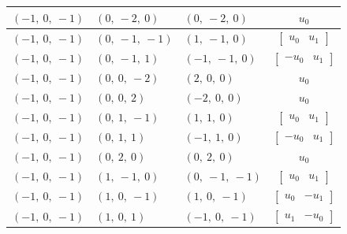 \documentclass[11pt]{article}
\theoremstyle{definition}
\begin{document}
\begin{longtable}{|l|l|l|c|}
    \hline
    $\left( -1, \  0, \  -1\right)$ & $\left( 0, \  -2, \  0\right)$ & $\left( 0, \  -2, \  0\right)$ & $u_{0}$ \\
    \hline
    $\left( -1, \  0, \  -1\right)$ & $\left( 0, \  -1, \  -1\right)$ & $\left( 1, \  -1, \  0\right)$ & $\left[\begin{matrix}u_{0} & u_{1}\end{matrix}\right]$ \\
    \hline
    $\left( -1, \  0, \  -1\right)$ & $\left( 0, \  -1, \  1\right)$ & $\left( -1, \  -1, \  0\right)$ & $\left[\begin{matrix}- u_{0} & u_{1}\end{matrix}\right]$ \\
    \hline
    $\left( -1, \  0, \  -1\right)$ & $\left( 0, \  0, \  -2\right)$ & $\left( 2, \  0, \  0\right)$ & $u_{0}$ \\
    \hline
    $\left( -1, \  0, \  -1\right)$ & $\left( 0, \  0, \  2\right)$ & $\left( -2, \  0, \  0\right)$ & $u_{0}$ \\
    \hline
    $\left( -1, \  0, \  -1\right)$ & $\left( 0, \  1, \  -1\right)$ & $\left( 1, \  1, \  0\right)$ & $\left[\begin{matrix}u_{0} & u_{1}\end{matrix}\right]$ \\
    \hline
    $\left( -1, \  0, \  -1\right)$ & $\left( 0, \  1, \  1\right)$ & $\left( -1, \  1, \  0\right)$ & $\left[\begin{matrix}- u_{0} & u_{1}\end{matrix}\right]$ \\
    \hline
    $\left( -1, \  0, \  -1\right)$ & $\left( 0, \  2, \  0\right)$ & $\left( 0, \  2, \  0\right)$ & $u_{0}$ \\
    \hline
    $\left( -1, \  0, \  -1\right)$ & $\left( 1, \  -1, \  0\right)$ & $\left( 0, \  -1, \  -1\right)$ & $\left[\begin{matrix}u_{0} & u_{1}\end{matrix}\right]$ \\
    \hline
    $\left( -1, \  0, \  -1\right)$ & $\left( 1, \  0, \  -1\right)$ & $\left( 1, \  0, \  -1\right)$ & $\left[\begin{matrix}u_{0} & - u_{1}\end{matrix}\right]$ \\
    \hline
    $\left( -1, \  0, \  -1\right)$ & $\left( 1, \  0, \  1\right)$ & $\left( -1, \  0, \  -1\right)$ & $\left[\begin{matrix}u_{1} & - u_{0}\end{matrix}\right]$ \\

\end{longtable}
\end{document}
